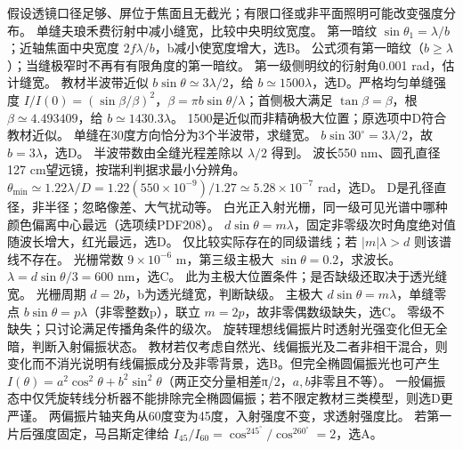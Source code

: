 \crosscheck 假设透镜口径足够、屏位于焦面且无截光；有限口径或非平面照明可能改变强度分布。
\problemtext 单缝夫琅禾费衍射中减小缝宽，比较中央明纹宽度。
\workings 第一暗纹 $\sin\theta_1=\lambda/b$；近轴焦面中央宽度 $2f\lambda/b$，b减小使宽度增大，选B。
\crosscheck 公式须有第一暗纹（$b\ge\lambda$）；当缝极窄时不再有有限角度的第一暗纹。
\problemtext 第一级侧明纹的衍射角0.001 rad，估计缝宽。
\workings 教材半波带近似 $b\sin\theta\simeq3\lambda/2$，给 $b\simeq1500\lambda$，选D。严格均匀单缝强度 $I/I(0)=(\sin\beta/\beta)^2$，$\beta=\pi b\sin\theta/\lambda$；首侧极大满足 $\tan\beta=\beta$，根 $\beta\simeq4.493409$，给 $b\simeq1430.3\lambda$。
\crosscheck 1500是近似而非精确极大位置；原选项中D符合教材近似。
\problemtext 单缝在30度方向恰分为3个半波带，求缝宽。
\workings $b\sin30^\circ=3\lambda/2$，故 $b=3\lambda$，选D。
\crosscheck 半波带数由全缝光程差除以 $\lambda/2$ 得到。
\problemtext 波长550 nm、圆孔直径127 cm望远镜，按瑞利判据求最小分辨角。
\workings $\theta_{\min}\simeq1.22\lambda/D=1.22(550\times10^{-9})/1.27\simeq5.28\times10^{-7}$ rad，选D。
\crosscheck D是孔径直径，非半径；忽略像差、大气扰动等。
\problemtext 白光正入射光栅，同一级可见光谱中哪种颜色偏离中心最远（选项续PDF208）。
\workings $d\sin\theta=m\lambda$，固定非零级次时角度绝对值随波长增大，红光最远，选D。
\crosscheck 仅比较实际存在的同级谱线；若 $|m|\lambda>d$ 则该谱线不存在。
\problemtext 光栅常数 $9\times10^{-6}$ m，第三级主极大 $\sin\theta=0.2$，求波长。
\workings $\lambda=d\sin\theta/3=600$ nm，选C。
\crosscheck 此为主极大位置条件；是否缺级还取决于透光缝宽。
\problemtext 光栅周期 $d=2b$，b为透光缝宽，判断缺级。
\workings 主极大 $d\sin\theta=m\lambda$，单缝零点 $b\sin\theta=p\lambda$（非零整数p），联立 $m=2p$，故非零偶数级缺失，选C。
\crosscheck 零级不缺失；只讨论满足传播角条件的级次。
\problemtext 旋转理想线偏振片时透射光强变化但无全暗，判断入射偏振状态。
\workings 教材若仅考虑自然光、线偏振光及二者非相干混合，则变化而不消光说明有线偏振成分及非零背景，选B。但完全椭圆偏振光也可产生 $I(\theta)=a^2\cos^2\theta+b^2\sin^2\theta$（两正交分量相差π/2，$a,b$非零且不等）。
\crosscheck 一般偏振态中仅凭旋转线分析器不能排除完全椭圆偏振；若不限定教材三类模型，则选D更严谨。
\problemtext 两偏振片轴夹角从60度变为45度，入射强度不变，求透射强度比。
\workings 若第一片后强度固定，马吕斯定律给 $I_{45}/I_{60}=\cos^245^\circ/\cos^260^\circ=2$，选A。
